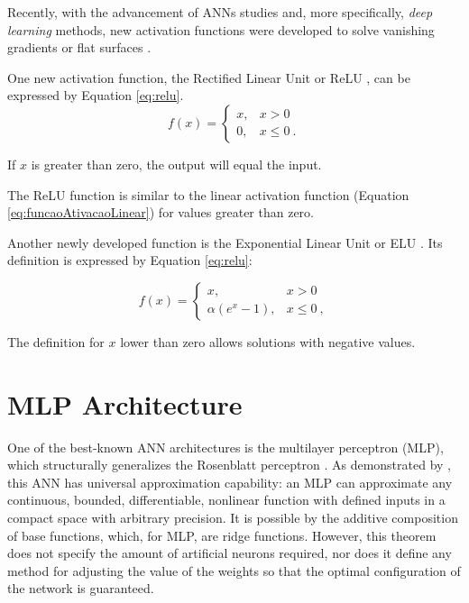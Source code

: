 Recently, with the advancement of ANNs studies and, more specifically, \textit{deep learning} methods, new activation functions were developed to solve vanishing gradients or flat surfaces \cite{Fahlman1988}.

One new activation function, the Rectified Linear Unit or ReLU \cite{Maas2013}, can be expressed by Equation \ref{eq:relu}.
\begin{equation}
	\label{eq:relu}
	f(x) = \left\{\begin{matrix}
		x, & x > 0    \\
		0, & x \leq 0 \:.
	\end{matrix}\right.
\end{equation}

\noindent
If $x$ is greater than zero, the output will equal the input.

The ReLU function is similar to the linear activation function (Equation \ref{eq:funcaoAtivacaoLinear}) for values greater than zero. %

Another newly developed function is the Exponential Linear Unit or ELU \cite{Clevert2016}. Its definition is expressed by Equation \ref{eq:relu}:

\begin{equation}
	\label{eq:elu}
	f(x) = \left\{\begin{matrix}
		x,               & x > 0    \\
		\alpha(e^x - 1), & x \leq 0 \:,
	\end{matrix}\right.
\end{equation}

The definition for $x$ lower than zero allows solutions with negative values.

\section{MLP Architecture}
\label{sec:mlp}

One of the best-known ANN architectures is the multilayer perceptron (MLP), which structurally generalizes the Rosenblatt perceptron \cite{Rosenblatt1958}. As demonstrated by \cite{Cybenko1989}, this ANN has universal approximation capability: an MLP can approximate any continuous, bounded, differentiable, nonlinear function with defined inputs in a compact space with arbitrary precision. It is possible by the additive composition of base functions, which, for MLP, are ridge functions. However, this theorem does not specify the amount of artificial neurons required, nor does it define any method for adjusting the value of the weights so that the optimal configuration of the network is guaranteed.

